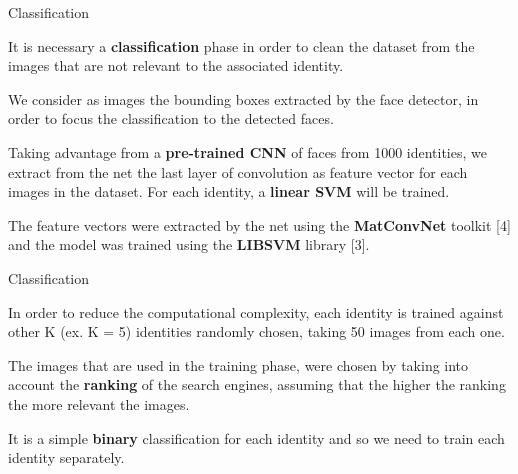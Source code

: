 \begin{tframe}{Classification}

It is necessary a \textbf{classification} phase in order to clean the dataset from the images that are not relevant to the associated identity.

\vspace{0.1in}

We consider as images the bounding boxes extracted by the face detector, in order to focus the classification to the detected faces.

\vspace{0.1in}

Taking advantage from a \textbf{pre-trained CNN} of faces from 1000 identities, we extract from the net the last layer of convolution as feature vector for each images in the dataset. For each identity, a \textbf{linear SVM} will be trained.

\vspace{0.1in}

The feature vectors were extracted by the net using the \textbf{MatConvNet} toolkit [4] and the model was trained using the \textbf{LIBSVM} library [3].

\end{tframe}


\begin{tframe}{Classification}

In order to reduce the computational complexity, each identity is trained against other K (ex. K = 5) identities randomly chosen, taking 50 images from each one.

\vspace{0.1in}

The images that are used in the training phase, were chosen by taking into account the \textbf{ranking} of the search engines, assuming that the higher the ranking the more relevant the images.

\vspace{0.1in}

It is a simple \textbf{binary} classification for each identity and so we need to train each identity separately.

\end{tframe}